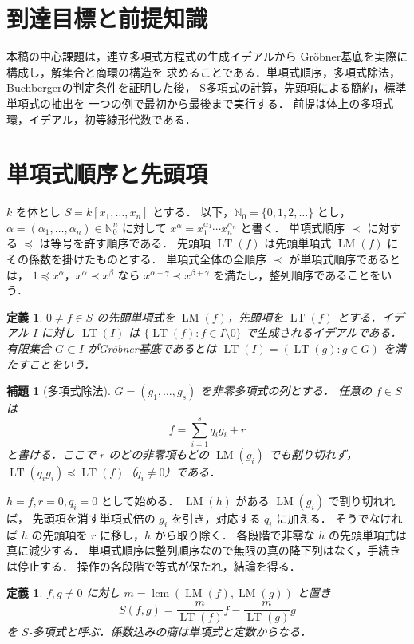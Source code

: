 \documentclass[a5paper,10pt,onecolumn]{jsarticle}
\makeatletter
\theoremstyle{mathnotetheorem}
\newtheorem{definition}[theorem]{定義}
\newtheorem{lemma}[theorem]{補題}
\renewcommand{\proofname}{証明}
\renewenvironment{proof}[1][\proofname]{%
  \par\pushQED{\qed}\normalfont\topsep4\p@\@plus2\p@\relax
  \trivlist\item[\hskip\labelsep\bfseries #1]\ignorespaces
}{\popQED\endtrivlist\@endpefalse}
\makeatother
\begin{document}
\section*{到達目標と前提知識}
本稿の中心課題は，連立多項式方程式の生成イデアルから
Gr\"obner基底を実際に構成し，解集合と商環の構造を
求めることである．単項式順序，多項式除法，
Buchbergerの判定条件を証明した後，
S多項式の計算，先頭項による簡約，標準単項式の抽出を
一つの例で最初から最後まで実行する．
前提は体上の多項式環，イデアル，初等線形代数である．

\section{単項式順序と先頭項}
$k$ を体とし $S=k[x_1,\ldots,x_n]$ とする．
以下，$\mathbb N_0=\{0,1,2,\ldots\}$ とし，
$\alpha=(\alpha_1,\ldots,\alpha_n)\in\mathbb N_0^n$ に対して
$x^\alpha=x_1^{\alpha_1}\cdots x_n^{\alpha_n}$ と書く．
単項式順序 $\prec$ に対する $\preceq$ は等号を許す順序である．
先頭項 $\operatorname{LT}(f)$ は先頭単項式 $\operatorname{LM}(f)$ に
その係数を掛けたものとする．
単項式全体の全順序 $\prec$ が単項式順序であるとは，
$1\preceq x^\alpha$，$x^\alpha\prec x^\beta$ なら
$x^{\alpha+\gamma}\prec x^{\beta+\gamma}$ を満たし，整列順序であることをいう．
\begin{definition}
$0\ne f\in S$ の先頭単項式を $\operatorname{LM}(f)$，先頭項を
$\operatorname{LT}(f)$ とする．イデアル $I$ に対し
$\operatorname{LT}(I)$ は $\{\operatorname{LT}(f):f\in I\setminus0\}$ で生成されるイデアルである．
有限集合 $G\subset I$ がGr\"obner基底であるとは
$\operatorname{LT}(I)=(\operatorname{LT}(g):g\in G)$ を満たすことをいう．
\end{definition}
\begin{lemma}[多項式除法]
$G=(g_1,\ldots,g_s)$ を非零多項式の列とする．
任意の $f\in S$ は
\[ f=\sum_{i=1}^s q_i g_i+r \]
と書ける．ここで $r$ のどの非零項もどの $\operatorname{LM}(g_i)$ でも割り切れず，
$\operatorname{LT}(q_i g_i)\preceq\operatorname{LT}(f)$（$q_i\ne0$）である．
\end{lemma}
\begin{proof}
$h=f,r=0,q_i=0$ として始める．
$\operatorname{LM}(h)$ がある $\operatorname{LM}(g_i)$ で割り切れれば，
先頭項を消す単項式倍の $g_i$ を引き，対応する $q_i$ に加える．
そうでなければ $h$ の先頭項を $r$ に移し，$h$ から取り除く．
各段階で非零な $h$ の先頭単項式は真に減少する．
単項式順序は整列順序なので無限の真の降下列はなく，手続きは停止する．
操作の各段階で等式が保たれ，結論を得る．
\end{proof}
\begin{definition}
$f,g\ne0$ に対し $m=\operatorname{lcm}(\operatorname{LM}(f),\operatorname{LM}(g))$ と置き
\[
 S(f,g)=\frac{m}{\operatorname{LT}(f)}f-
        \frac{m}{\operatorname{LT}(g)}g
\]
を $S$-多項式と呼ぶ．係数込みの商は単項式と定数からなる．
\end{definition}
\end{document}
